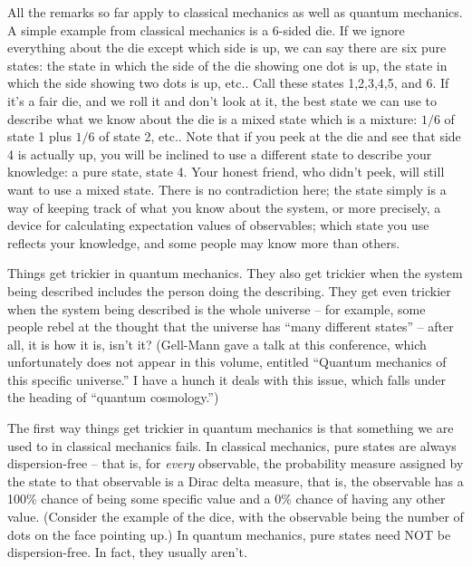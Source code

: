 \documentclass{article}
\begin{document}
All the remarks so far apply to classical mechanics as well as quantum
mechanics. A simple example from classical mechanics is a 6-sided die.
If we ignore everything about the die except which side is up, we can
say there are six pure states: the state in which the side of the die
showing one dot is up, the state in which the side showing two dots is
up, etc.. Call these states 1,2,3,4,5, and 6. If it's a fair die, and we
roll it and don't look at it, the best state we can use to describe what
we know about the die is a mixed state which is a mixture: \(1/6\) of
state 1 plus \(1/6\) of state 2, etc.. Note that if you peek at the die
and see that side 4 is actually up, you will be inclined to use a
different state to describe your knowledge: a pure state, state 4. Your
honest friend, who didn't peek, will still want to use a mixed state.
There is no contradiction here; the state simply is a way of keeping
track of what you know about the system, or more precisely, a device for
calculating expectation values of observables; which state you use
reflects your knowledge, and some people may know more than others.

Things get trickier in quantum mechanics. They also get trickier when
the system being described includes the person doing the describing.
They get even trickier when the system being described is the whole
universe -- for example, some people rebel at the thought that the
universe has ``many different states'' -- after all, it is how it is,
isn't it? (Gell-Mann gave a talk at this conference, which unfortunately
does not appear in this volume, entitled ``Quantum mechanics of this
specific universe.'' I have a hunch it deals with this issue, which
falls under the heading of ``quantum cosmology.'')

The first way things get trickier in quantum mechanics is that something
we are used to in classical mechanics fails. In classical mechanics,
pure states are always dispersion-free -- that is, for \emph{every}
observable, the probability measure assigned by the state to that
observable is a Dirac delta measure, that is, the observable has a 100\%
chance of being some specific value and a 0\% chance of having any other
value. (Consider the example of the dice, with the observable being the
number of dots on the face pointing up.) In quantum mechanics, pure
states need NOT be dispersion-free. In fact, they usually aren't.
\end{document}
